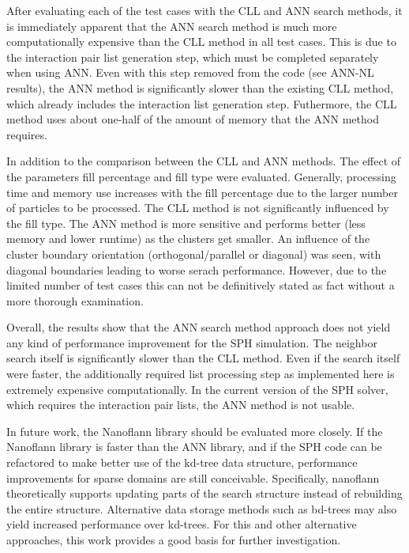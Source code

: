 After evaluating each of the test cases with the CLL and ANN search methods, it is immediately apparent that the ANN search method is much more computationally expensive than the CLL method in all test cases. This is due to the interaction pair list generation step, which must be completed separately when using ANN. Even with this step removed from the code (see ANN-NL results), the ANN method is significantly slower than the existing CLL method, which already includes the interaction list generation step. Futhermore, the CLL method uses about one-half of the amount of memory that the ANN method requires.

In addition to the comparison between the CLL and ANN methods. The effect of the parameters fill percentage and fill type were evaluated. Generally, processing time and memory use increases with the fill percentage due to the larger number of particles to be processed. The CLL method is not significantly influenced by the fill type. The ANN method is more sensitive and performs better (less memory and lower runtime) as the clusters get smaller. An influence of the cluster boundary orientation (orthogonal/parallel or diagonal) was seen, with diagonal boundaries leading to worse serach performance. However, due to the limited number of test cases this can not be definitively stated as fact without a more thorough examination.

Overall, the results show that the ANN search method approach does not yield any kind of performance improvement for the SPH simulation. The neighbor search itself is significantly slower than the CLL method. Even if the search itself were faster, the additionally required list processing step as implemented here is extremely  expensive computationally. In the current version of the SPH solver, which requires the interaction pair lists, the ANN method is not usable.

In future work, the Nanoflann library should be evaluated more closely. If the Nanoflann library is faster than the ANN library, and if the SPH code can be refactored to make better use of the kd-tree data structure, performance improvements for sparse domains are still conceivable.  Specifically, nanoflann theoretically supports updating parts of the search structure instead of rebuilding the entire structure. Alternative data storage methods such as bd-trees may also yield increased performance over kd-trees. For this and other alternative approaches, this work provides a good basis for further investigation.